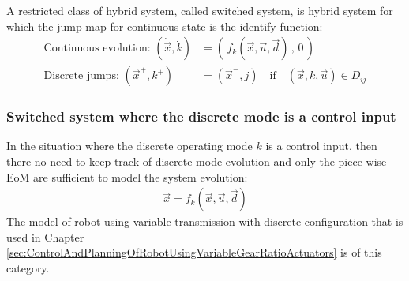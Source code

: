 A restricted class of hybrid system, called switched system, is hybrid system for which the jump map for continuous state is the identify function:
%
\begin{align}
\text{Continuous evolution: } \left(  \dot{\vec{x}} , \dot{k} \right) &=  \left( \, f_k( \vec{x} , \vec{u} , \vec{d} ) \, , \, 0 \, \right) \\
\text{Discrete jumps: } \left(  \vec{x}^+ , k^+ \right) &=  \left( \vec{x}^- , j \right) \quad\text{if}\quad \left(  \vec{x} , k , \vec{u} \right) \in D_{ij} 
\end{align}
%

\subsubsection{Switched system where the discrete mode is a control input}

In the situation where the discrete operating mode $k$ is a control input, then there no need to keep track of discrete mode evolution and only the piece wise EoM are sufficient to model the system evolution:
%
\begin{align}
\dot{\vec{x}} = f_k( \vec{x} , \vec{u} , \vec{d} ) 
\end{align}
%
The model of robot using variable transmission with discrete configuration that is used in Chapter \ref{sec:ControlAndPlanningOfRobotUsingVariableGearRatioActuators} is of this category. 
